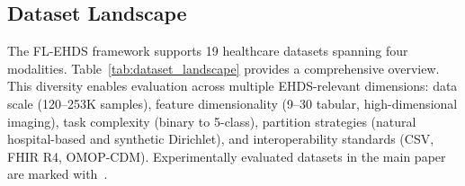 \documentclass[conference]{IEEEtran}
\begin{document}
\subsection{Dataset Landscape}
\label{sec:dataset_landscape}

The FL-EHDS framework supports 19 healthcare datasets spanning four modalities. Table~\ref{tab:dataset_landscape} provides a comprehensive overview. This diversity enables evaluation across multiple EHDS-relevant dimensions: data scale (120--253K samples), feature dimensionality (9--30 tabular, high-dimensional imaging), task complexity (binary to 5-class), partition strategies (natural hospital-based and synthetic Dirichlet), and interoperability standards (CSV, FHIR R4, OMOP-CDM). Experimentally evaluated datasets in the main paper are marked with~\checkmark.
\end{document}
